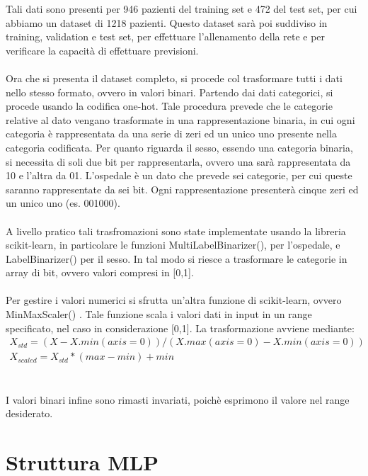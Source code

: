 Tali dati sono presenti per 946 pazienti del training set e 472 del test set, per cui abbiamo un dataset di 1218 pazienti.
Questo dataset sarà poi suddiviso in training, validation e test set, per effettuare l'allenamento della rete e per verificare la capacità di effettuare previsioni.
\\\\
Ora che si presenta il dataset completo, si procede col trasformare tutti i dati nello stesso formato, ovvero in valori binari.
Partendo dai dati categorici, si procede usando la codifica one-hot. Tale procedura prevede che le categorie relative al dato vengano 
trasformate in una rappresentazione binaria, in cui ogni categoria è rappresentata da una serie di zeri ed un unico uno presente nella categoria
codificata.
Per quanto riguarda il sesso, essendo una categoria binaria, si necessita di soli due bit per rappresentarla, ovvero
una sarà rappresentata da 10 e l'altra da 01.
L'ospedale è un dato che prevede sei categorie, per cui queste saranno rappresentate da sei bit. Ogni rappresentazione
presenterà cinque zeri ed un unico uno (es. 001000).
\\\\
A livello pratico tali trasfromazioni sono state implementate usando la libreria scikit-learn, in particolare le funzioni
MultiLabelBinarizer(), per l'ospedale, e LabelBinarizer() per il sesso. In tal modo si riesce a trasformare le categorie in array di 
bit, ovvero valori compresi in [0,1].
\\\\
Per gestire i valori numerici si sfrutta un'altra funzione di scikit-learn, ovvero MinMaxScaler() \cite{ar}.
Tale funzione scala i valori dati in input in un range specificato, nel caso in considerazione [0,1].
La trasformazione avviene mediante:
\begin{equation*}
    \begin{array}{l}
        X_{std} = (X - X.min(axis=0)) / (X.max(axis=0) - X.min(axis=0)) \\
        X_{scaled} = X_{std} * (max - min) + min
    \end{array}
\end{equation*}
\\\\
I valori binari infine sono rimasti invariati, poichè esprimono il valore nel range desiderato.

\section{Struttura MLP}


